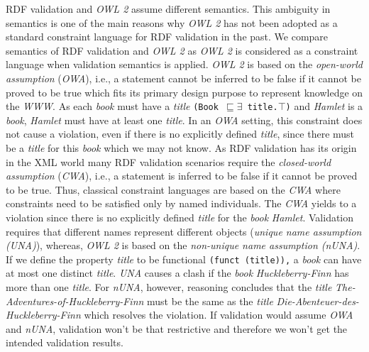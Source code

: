 \documentclass[a4paper,fontsize=11pt]{scrartcl}
\newcommand{\ms}[1]{\texttt{#1}}
\begin{document}
RDF validation and \emph{OWL 2} assume different semantics. 
This ambiguity in semantics is one of the main reasons why \emph{OWL 2} has not been adopted as a standard constraint language for RDF validation in the past.
We compare semantics of RDF validation and \emph{OWL 2} as \emph{OWL 2} is considered as a constraint language 
when validation semantics is applied.
%
\emph{OWL 2} is based on the {\em open-world assumption} (\emph{OWA}), i.e., a statement cannot be inferred to be false if it cannot be proved to be true  which fits its primary design purpose to represent knowledge on the \emph{WWW}. 
As each \emph{book} must have a \emph{title} {\small\ms{(Book $\sqsubseteq \exists$ title.$\top$)}} and {\em Hamlet} is a \emph{book}, %
{\em Hamlet} must have at least one \emph{title}.
In an \emph{OWA} setting, this constraint does not cause a violation, even if there is no explicitly defined \emph{title}, since there must be a \emph{title} for this \emph{book} which we may not know. 
As RDF validation has its origin in the XML world
many RDF validation scenarios require the {\em closed-world assumption} (\emph{CWA}), i.e., a statement is inferred to be false if it cannot be proved to be true.
Thus, classical constraint languages are based on the \emph{CWA} where constraints need to be satisfied only by named individuals. 
The \emph{CWA} yields to a violation since there is no explicitly defined \emph{title} for the \emph{book} {\em Hamlet}. 
%
Validation requires that different names represent different objects (\emph{unique name assumption (UNA)}), whereas,
\emph{OWL 2} is based on the {\em non-unique name assumption (nUNA)}.  
If we define the property \emph{title} to be functional {\small\ms{(funct (title)),}} a \emph{book} can have at most one distinct \emph{title}.
\emph{UNA} causes a clash
if the \emph{book} {\em Huckleberry-Finn} has more than one \emph{title}.
For \emph{nUNA}, however, reasoning concludes that the \emph{title} {\em The-Adventures-of-Huckleberry-Finn} must be the same as the \emph{title} {\em Die-Abenteuer-des-Huckleberry-Finn} 
which resolves the violation. 
If validation would assume \emph{OWA} and \emph{nUNA}, validation won’t be that restrictive and therefore we won’t get the intended validation results.
%
\end{document}
